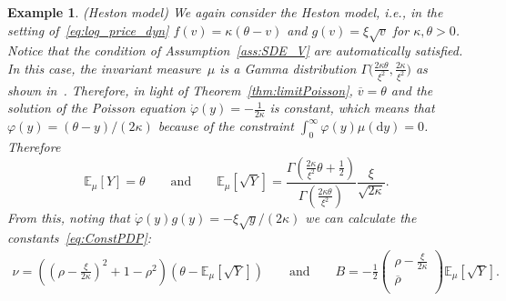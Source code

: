 \documentclass{amsart}[11pt]
\numberwithin{equation}{section}
\numberwithin{theorem}{subsection}
\numberwithin{proposition}{subsection}
\numberwithin{definition}{subsection}
\numberwithin{lemma}{subsection}
\newtheorem*{example}{Example}
\numberwithin{assumption}{subsection}
\newcommand{\EE}{\mathbb{E}}
\newcommand{\Wf}{\boldsymbol{\mathrm{W}}}
\newcommand{\Wp}{W^{\perp}}
\newcommand{\brho}{\overline{\rho}}
\newcommand{\D}{\mathrm{d}}
\newcommand{\eps}{\varepsilon}
\newcommand{\hh}{\boldsymbol{\mathrm{h}}}
\newcommand\blue[1]{\textcolor{blue}{#1}}
\begin{document}
\begin{example}(Heston model) We again consider the Heston model, i.e., in the setting of~\eqref{eq:log_price_dyn} $f(v)=\kappa(\theta - v)$ and $g(v)=\xi\sqrt{v}$ for $\kappa,\theta>0$. 
Notice that the condition of Assumption~\ref{ass:SDE_V} are automatically satisfied. 
In this case, the invariant measure~$\mu$ is a Gamma distribution $\Gamma\big(\frac{2\kappa\theta}{\xi^2}, \frac{2\kappa}{\xi^2}\big)$ 
as shown in~\cite{cox1985theory}. 
Therefore, in light of Theorem~\ref{thm:limitPoisson}, 
$\overline{v} = \theta$ and the solution of the Poisson equation $\dot{\varphi}(y)=-\frac{1}{2\kappa}$ is constant, which means
that
$\varphi(y) = (\theta-y)/(2\kappa)$
because of the constraint $\int_{0}^{\infty}\varphi(y)\mu(\D y)=0$.
Therefore 
$$
\EE_\mu[Y] = \theta
\qquad\text{and}\qquad
\EE_\mu\left[\sqrt{Y}\right]
=\frac{\Gamma\left( \frac{2\kappa}{\xi^2}\theta + \frac{1}{2} \right )}{\Gamma\left( \frac{2\kappa\theta}{\xi^2} \right )} \frac{\xi}{\sqrt{2\kappa}}.
$$
From this, noting that $\dot{\varphi}(y)g(y) = -\xi\sqrt{y}/(2\kappa)$ we can calculate the constants~\eqref{eq:ConstPDP}:
\begin{align*}
\nu = \left( \left( \rho - \frac{\xi}{2\kappa} \right)^2 + 1-\rho^2 \right)\left( \theta - \EE_\mu\left[\sqrt{Y}\right]\right)
\qquad \text{and} \qquad
B = -\frac{1}{2}
\begin{pmatrix}
\rho - \frac{\xi}{2\kappa}\\
\brho\\
\end{pmatrix}\EE_\mu\left[\sqrt{Y}\right].
\end{align*}
\end{example}



\end{document}
